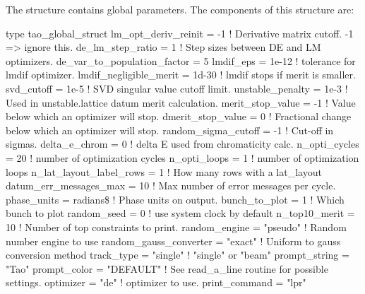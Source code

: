 {{{{{{{{
The  structure contains \tao global parameters. The components of this structure are:
\begin{example}
type tao_global_struct
  lm_opt_deriv_reinit = -1         ! Derivative matrix cutoff. -1 => ignore this.
  de_lm_step_ratio = 1             ! Step sizes between DE and LM optimizers.
  de_var_to_population_factor = 5 
  lmdif_eps = 1e-12                ! tolerance for lmdif optimizer.
  lmdif_negligible_merit = 1d-30   ! lmdif stops if merit is smaller.
  svd_cutoff = 1e-5                ! SVD singular value cutoff limit.
  unstable_penalty = 1e-3          ! Used in unstable.lattice datum merit calculation.
  merit_stop_value = -1            ! Value below which an optimizer will stop.
  dmerit_stop_value = 0            ! Fractional change below which an optimizer will stop.
  random_sigma_cutoff = -1         ! Cut-off in sigmas.
  delta_e_chrom = 0                ! delta E used from chromaticity calc.
  n_opti_cycles = 20               ! number of optimization cycles
  n_opti_loops = 1                 ! number of optimization loops
  n_lat_layout_label_rows = 1      ! How many rows with a lat_layout
  datum_err_messages_max = 10      ! Max number of error messages per cycle.
  phase_units = radians\$           ! Phase units on output.
  bunch_to_plot = 1                ! Which bunch to plot
  random_seed = 0                  ! use system clock by default
  n_top10_merit = 10               ! Number of top constraints to print.
  random_engine = "pseudo"         ! Random number engine to use
  random_gauss_converter = "exact" ! Uniform to gauss conversion method
  track_type = "single"            ! "single" or "beam" 
  prompt_string = "Tao"
  prompt_color = "DEFAULT"         ! See read_a_line routine for possible settings.
  optimizer     = "de"             ! optimizer to use.
  print_command = "lpr"

\end{example}}}}}}}}}
